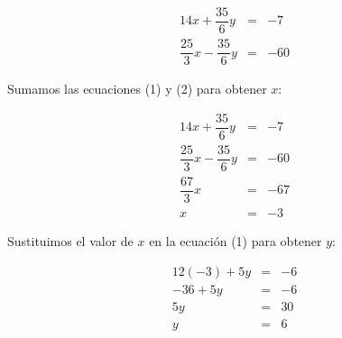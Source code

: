 \documentclass[12pt,addpoints,answers]{repaso}
\begin{document}
\begin{questions}
{\begin{solutionbox}{11.5cm}
            \begin{eqnarray}
                14x + \dfrac{35}{6}y & = & -7 \nonumber\\
                \dfrac{25}{3}x - \dfrac{35}{6}y & = & -60 \nonumber
            \end{eqnarray}

            Sumamos las ecuaciones (1) y (2) para obtener $x$:

            \begin{eqnarray}
                14x + \dfrac{35}{6}y & = & -7 \nonumber\\
                \dfrac{25}{3}x - \dfrac{35}{6}y & = & -60 \nonumber\\ \hline
                \dfrac{67}{3}x & = & -67 \nonumber\\
                x & = & -3 \nonumber
            \end{eqnarray}

            Sustituimos el valor de $x$ en la ecuación (1) para obtener $y$:

            \begin{eqnarray}
                12(-3) + 5y & = & -6 \nonumber\\
                -36 + 5y & = & -6 \nonumber\\
                5y & = & 30 \nonumber\\
                y & = & 6 \nonumber
            \end{eqnarray}
        \end{solutionbox}
    }

\end{questions}
\end{document}
